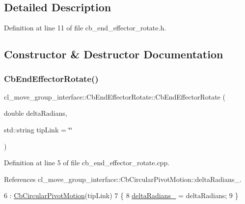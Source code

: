 \subsection{Detailed Description}


Definition at line 11 of file cb\+\_\+end\+\_\+effector\+\_\+rotate.\+h.



\subsection{Constructor \& Destructor Documentation}
\mbox{\label{classcl__move__group__interface_1_1CbEndEffectorRotate_a5a3f91fcbb0196baeaae40c4c38a59e8}} 
\subsubsection{\texorpdfstring{Cb\+End\+Effector\+Rotate()}{CbEndEffectorRotate()}}
{\footnotesize\ttfamily cl\+\_\+move\+\_\+group\+\_\+interface\+::\+Cb\+End\+Effector\+Rotate\+::\+Cb\+End\+Effector\+Rotate (\begin{DoxyParamCaption}\item[{double}]{delta\+Radians,  }\item[{std\+::string}]{tip\+Link = {\ttfamily \char`\"{}\char`\"{}} }\end{DoxyParamCaption})}



Definition at line 5 of file cb\+\_\+end\+\_\+effector\+\_\+rotate.\+cpp.



References cl\+\_\+move\+\_\+group\+\_\+interface\+::\+Cb\+Circular\+Pivot\+Motion\+::delta\+Radians\+\_\+.


\begin{DoxyCode}
6         : \hyperlink{classcl__move__group__interface_1_1CbCircularPivotMotion_adc0d93cb33df529d6a1e277fed25ceb1}{CbCircularPivotMotion}(tipLink)
7     \{
8         \hyperlink{classcl__move__group__interface_1_1CbCircularPivotMotion_afade33f1182615c64ea972075bfd2b95}{deltaRadians\_} = deltaRadians;
9     \}
\end{DoxyCode}
\mbox{\label{classcl__move__group__interface_1_1CbEndEffectorRotate_a3c3590d9460c861aa9e146fbbbf4e396}} 
